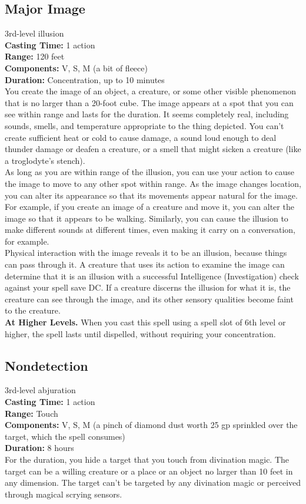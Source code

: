 \documentclass[11pt, A4paper, english]{article}
\begin{document}
		\subsection{Major Image}
3rd-level illusion \\
\textbf{Casting Time:} 1 action \\
\textbf{Range:} 120 feet \\
\textbf{Components:} V, S, M (a bit of fleece) \\
\textbf{Duration:} Concentration, up to 10 minutes \\
You create the image of an object, a creature, or some other visible phenomenon that is no larger than a 20-foot cube. The image appears at a spot that you can see within range and lasts for the duration. It seems completely real, including sounds, smells, and temperature appropriate to the thing depicted. You can't create sufficient heat or cold to cause damage, a sound loud enough to deal thunder damage or deafen a creature, or a smell that might sicken a creature (like a troglodyte's stench). \\
As long as you are within range of the illusion, you can use your action to cause the image to move to any other spot within range. As the image changes location, you can alter its appearance so that its movements appear natural for the image. For example, if you create an image of a creature and move it, you can alter the image so that it appears to be walking. Similarly, you can cause the illusion to make different sounds at different times, even making it carry on a conversation, for example. \\
Physical interaction with the image reveals it to be an illusion, because things can pass through it. A creature that uses its action to examine the image can determine that it is an illusion with a successful Intelligence (Investigation) check against your spell save DC. If a creature discerns the illusion for what it is, the creature can see through the image, and its other sensory qualities become faint to the creature. \\
\textbf{At Higher Levels.} When you cast this spell using a spell slot of 6th level or higher, the spell lasts until dispelled, without requiring your concentration.

		\subsection{Nondetection}
3rd-level abjuration \\
\textbf{Casting Time:} 1 action \\
\textbf{Range:} Touch \\
\textbf{Components:} V, S, M (a pinch of diamond dust worth 25 gp sprinkled over the target, which the spell consumes) \\
\textbf{Duration:} 8 hours \\
For the duration, you hide a target that you touch from divination magic. The target can be a willing creature or a place or an object no larger than 10 feet in any dimension. The target can't be targeted by any divination magic or perceived through magical scrying sensors.
\end{document}
